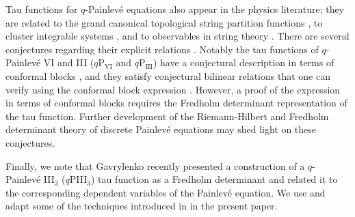 \documentclass[a4paper,reqno,11pt]{amsart}
\numberwithin{equation}{section}
\numberwithin{figure}{section}
\theoremstyle{plain}
\theoremstyle{remark}
\newcommand\Psix{\textrm{P}_{\textrm{VI}}}
\newcommand\Pthree{\textrm{P}_{\textrm{III}}}
\numberwithin{rhp}{section}
\begin{document}
Tau functions for $q$-Painlev\'e equations also appear in the physics literature; they are related to the grand canonical topological string partition functions \cite{bonelli2018quantumcurvesqdeformedpainleve}, to cluster integrable systems \cite{bershtein2024clusterreductionsmutationsqpainleve}, and to observables in string theory \cite{nosaka2023q,bonelli2022m2,Bonelli_2021}. There are several conjectures regarding their explicit relations \cite{Bershtein_2015,Bershtein_2017,bonelli2022m2,nosaka2023q}. Notably the tau functions of $q$-Painlev\'e VI and III ($q\Psix$ and $q\Pthree$) have a conjectural description in terms of conformal blocks \cite{Bershtein_2017,JNS2017}, and they satisfy conjectural bilinear relations that one can verify using the conformal block expression \cite{JNS2017,stoyan2025blowuprelationsqpainlevevi}. 
However, a proof of the expression in terms of conformal blocks requires the Fredholm determinant representation of the tau function. 
Further development of the Riemann-Hilbert and Fredholm determinant theory of discrete Painlev\'e equations may shed light on these conjectures.


Finally, we note that Gavrylenko \cite{gavrylenko2025riemannhilbertproblemsfredholmdeterminants} recently presented a construction of a $q$-Painlev\'e III$_3$ ($q$PIII$_3$) tau function as a Fredholm determinant and related it to the corresponding dependent variables of the Painlev\'e equation. We use and adapt some of the techniques introduced in \cite{gavrylenko2025riemannhilbertproblemsfredholmdeterminants} in the present paper.
\end{document}
